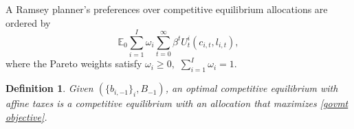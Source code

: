 \documentclass[thmsb,11pt]{article}
\newtheorem{definition}{Definition}
\begin{document}




A Ramsey planner's preferences over  competitive equilibrium allocations are ordered by
\begin{equation}
\mathbb{E}_{0}\sum_{i=1}^{I}\omega_{i}\sum_{t=0}^{\infty}\beta^{t}U_{t}^{i}\left(c_{i,t},l_{i,t}\right),\label{govmt objective}
\end{equation}
where the Pareto weights satisfy $\omega_{i}\geq0,$ $\sum_{i=1}^{I}\omega_{i}=1$.


\begin{definition}
\label{Def: optimal CE affine} Given $(\{b_{i,-1}\}_{i},B_{-1})$, an optimal
competitive equilibrium with affine taxes is a competitive equilibrium with an allocation that maximizes \eqref{govmt objective}.
\end{definition}
%
%
%
%
\end{document}
